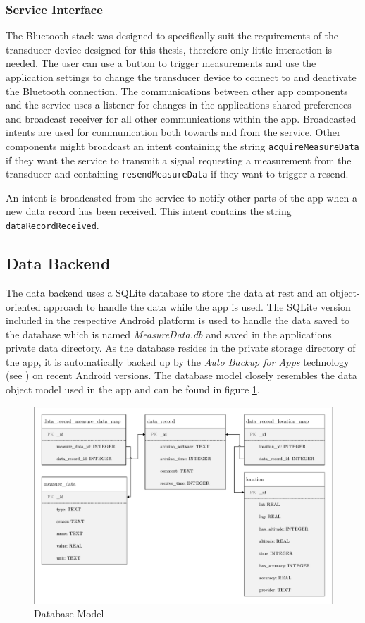 \subsubsection{Service Interface}
The Bluetooth stack was designed to specifically suit the requirements of the transducer device designed for this thesis, therefore only little interaction is needed. The user can use a button to trigger measurements and use the application settings to change the transducer device to connect to and deactivate the Bluetooth connection. The communications between other app components and the service uses a listener for changes in the applications shared preferences and broadcast receiver for all other communications within the app. Broadcasted intents are used for communication both towards and from the service. Other components might broadcast an intent containing the string \texttt{acquireMeasureData} if they want the service to transmit a signal requesting a measurement from the transducer and containing \texttt{resendMeasureData} if they want to trigger a resend. 

An intent is broadcasted from the service to notify other parts of the app when a new data record has been received. This intent contains the string \texttt{dataRecordReceived}.

\subsection{Data Backend}
The data backend uses a SQLite database to store the data at rest and an object-oriented approach to handle the data while the app is used. The SQLite version included in the respective Android platform is used to handle the data saved to the database which is named \emph{MeasureData.db} and saved in the applications private data directory. As the database resides in the private storage directory of the app, it is automatically backed up by the \emph{Auto Backup for Apps} technology (see \cite{Backup}) on recent Android versions. The database model closely resembles the data object model used in the app and can be found in figure \ref{fig:database}.

\begin{figure}[h]
\centering
\includegraphics[width=1.0\textwidth]{src/database.pdf}
\caption{Database Model}
\label{fig:database}
\end{figure}

